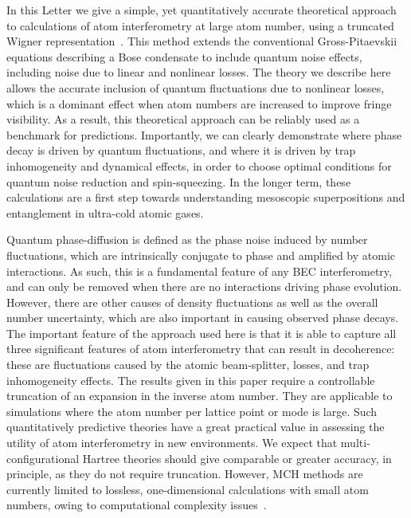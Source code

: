 \documentclass[aps,prl,twocolumn,showpacs,amsmath,amssymb,superscriptaddress,flushbottom,noraggedfooter]{revtex4-1}
\begin{document}
In this Letter we give a simple, yet quantitatively accurate theoretical approach
to calculations of atom interferometry at large atom number,
using a truncated Wigner representation~\cite{Drummond1993,Steel1998,Sinatra2002}.
This method extends the conventional Gross-Pitaevskii equations
describing a Bose condensate to include quantum noise effects,
including noise due to linear and nonlinear losses.
The theory we describe here allows the accurate inclusion of quantum fluctuations due to nonlinear losses,
which is a dominant effect when atom numbers are increased to improve fringe visibility.
As a result, this theoretical approach can be reliably used as a benchmark for predictions.
Importantly, we can clearly demonstrate where phase decay is driven by quantum fluctuations,
and where it is driven by trap inhomogeneity and dynamical effects,
in order to choose optimal conditions for quantum noise reduction and spin-squeezing.
In the longer term, these calculations are a first step towards understanding
mesoscopic superpositions and entanglement in ultra-cold atomic gases.

Quantum phase-diffusion is defined as the phase noise induced by number fluctuations,
which are intrinsically conjugate to phase and amplified by atomic interactions.
As such, this is a fundamental feature of any BEC interferometry,
and can only be removed when there are no interactions driving phase evolution.
However, there are other causes of density fluctuations as well as the overall number uncertainty,
which are also important in causing observed phase decays.
The important feature of the approach used here is that it is able to capture
all three significant features of atom interferometry that can result in decoherence:
these are fluctuations caused by the atomic beam-splitter, losses,
and trap inhomogeneity effects.
The results given in this paper require a controllable truncation
of an expansion in the inverse atom number.
They are applicable to simulations where the atom number per lattice point or mode is large.
Such quantitatively predictive theories have a great practical value
in assessing the utility of atom interferometry in new environments.
We expect that multi-configurational Hartree theories should give comparable or greater accuracy,
in principle, as they do not require truncation.
However, MCH methods are currently limited to lossless,
one-dimensional calculations with small atom numbers,
owing to computational complexity issues~\cite{Sakmann2009}.
\end{document}
